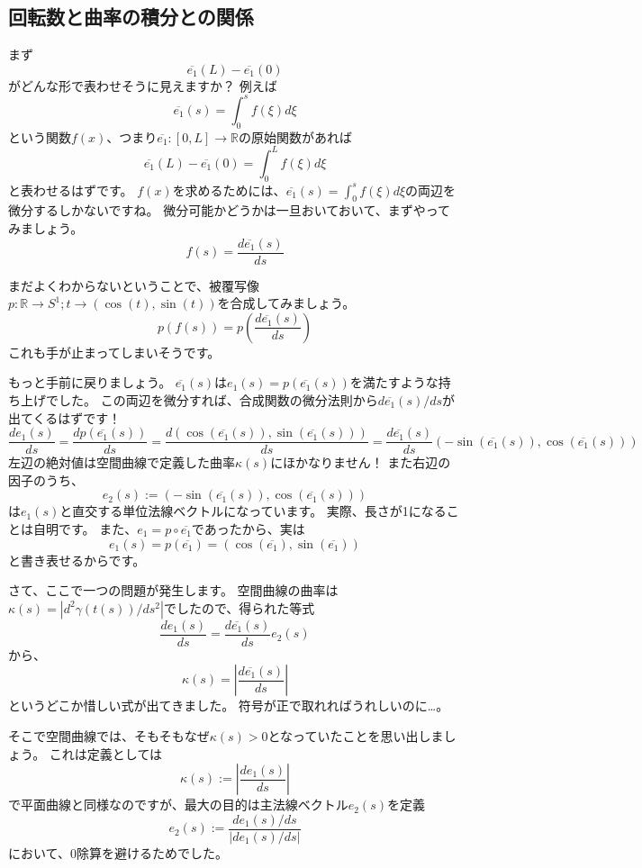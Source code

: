\subsection{回転数と曲率の積分との関係}

まず
\[
  \overline{e_1}(L)-\overline{e_1}(0)
\]
がどんな形で表わせそうに見えますか？
例えば
\[
  \overline{e_1}(s)=\int_0^s f(\xi)d\xi
\]
という関数$f(x)$、つまり$\overline{e_1}:[0,L]\to\mathbb{R}$の原始関数があれば
\[
  \overline{e_1}(L)-\overline{e_1}(0)=\int_0^Lf(\xi)d\xi
\]
と表わせるはずです。
$f(x)$を求めるためには、$\overline{e_1}(s)=\int_0^s f(\xi)d\xi$の両辺を微分するしかないですね。
微分可能かどうかは一旦おいておいて、まずやってみましょう。
\[
  f(s)=\frac{d\overline{e_1}(s)}{ds}
\]

まだよくわからないということで、被覆写像$p:\mathbb{R}\to S^1;t\to(\cos(t),\sin(t))$を合成してみましょう。
\[
  p(f(s))=p\left(\frac{d\overline{e_1}(s)}{ds}\right)
\]
これも手が止まってしまいそうです。

もっと手前に戻りましょう。
$\overline{e_1}(s)$は$e_1(s)=p(\overline{e_1}(s))$を満たすような持ち上げでした。
この両辺を微分すれば、合成関数の微分法則から$d\overline{e_1}(s)/ds$が出てくるはずです！
\[
  \frac{de_1(s)}{ds}=\frac{dp(\overline{e_1}(s))}{ds}=\frac{d(\cos(\overline{e_1}(s)),\sin(\overline{e_1}(s)))}{ds}=\frac{d\overline{e_1}(s)}{ds}(-\sin(\overline{e_1}(s)),\cos(\overline{e_1}(s)))
\]
左辺の絶対値は空間曲線で定義した曲率$\kappa(s)$にほかなりません！
また右辺の因子のうち、
\[
  e_2(s):=(-\sin(\overline{e_1}(s)),\cos(\overline{e_1}(s)))
\]
は$e_1(s)$と直交する単位法線ベクトルになっています。
実際、長さが1になることは自明です。
また、$e_1=p\circ\overline{e_1}$であったから、実は
\[
  e_1(s)=p(\overline{e_1})=(\cos(\overline{e_1}),\sin(\overline{e_1}))
\]
と書き表せるからです。

さて、ここで一つの問題が発生します。
空間曲線の曲率は$\kappa(s)=|d^2\gamma(t(s))/ds^2|$でしたので、得られた等式
\[
  \frac{de_1(s)}{ds}=\frac{d\overline{e_1}(s)}{ds}e_2(s)
\]
から、
\[
  \kappa(s)=\left|\frac{d\overline{e_1}(s)}{ds}\right|
\]
というどこか惜しい式が出てきました。
符号が正で取れればうれしいのに…。

そこで空間曲線では、そもそもなぜ$\kappa(s)>0$となっていたことを思い出しましょう。
これは定義としては
\[
  \kappa(s):=\left|\frac{de_1(s)}{ds}\right|
\]
で平面曲線と同様なのですが、最大の目的は主法線ベクトル$e_2(s)$を定義
\[
  e_2(s):=\frac{de_1(s)/ds}{|de_1(s)/ds|}
\]
において、0除算を避けるためでした。

